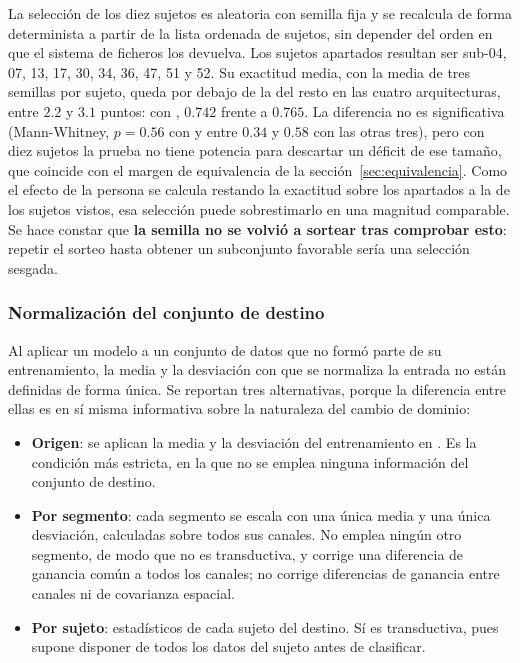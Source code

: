 La selección de los diez sujetos es aleatoria con semilla fija y se recalcula de forma
determinista a partir de la lista ordenada de sujetos, sin depender del orden en que el
sistema de ficheros los devuelva. Los sujetos apartados resultan ser
sub-04, 07, 13, 17, 30, 34, 36, 47, 51 y 52. Su exactitud \loso{} media, con la media de tres semillas por sujeto, queda por debajo
de la del resto en las cuatro arquitecturas, entre $2.2$ y $3.1$ puntos: con \eegnet{},
$0.742$ frente a $0.765$. La diferencia no es significativa (Mann-Whitney, $p = 0.56$ con
\eegnet{} y entre $0.34$ y $0.58$ con las otras tres), pero con diez sujetos la prueba no
tiene potencia para descartar un déficit de ese tamaño, que coincide con el margen de
equivalencia de la sección~\ref{sec:equivalencia}. Como el efecto de la persona se calcula
restando la exactitud sobre los apartados a la de los sujetos vistos, esa selección puede
sobrestimarlo en una magnitud comparable. Se hace
constar que \textbf{la semilla no se volvió a sortear tras comprobar esto}: repetir el
sorteo hasta obtener un subconjunto favorable sería una selección sesgada.

\subsubsection{Normalización del conjunto de destino}

Al aplicar un modelo a un conjunto de datos que no formó parte de su entrenamiento, la media y la desviación con que se
normaliza la entrada no están definidas de forma única. Se reportan tres alternativas, porque la
diferencia entre ellas es en sí misma informativa sobre la naturaleza del cambio de dominio:

\begin{itemize}
  \item \textbf{Origen}: se aplican la media y la desviación del entrenamiento en
  \openbmi{}. Es la condición más estricta, en la que no se emplea ninguna información del
  conjunto de destino.
  \item \textbf{Por segmento}: cada segmento se escala con una única media y una única
  desviación, calculadas sobre todos sus canales. No emplea ningún otro segmento, de modo
  que no es transductiva, y corrige una diferencia de ganancia común a todos los canales;
  no corrige diferencias de ganancia entre canales ni de covarianza espacial.
  \item \textbf{Por sujeto}: estadísticos de cada sujeto del destino. Sí es transductiva,
  pues supone disponer de todos los datos del sujeto antes de clasificar.
\end{itemize}

